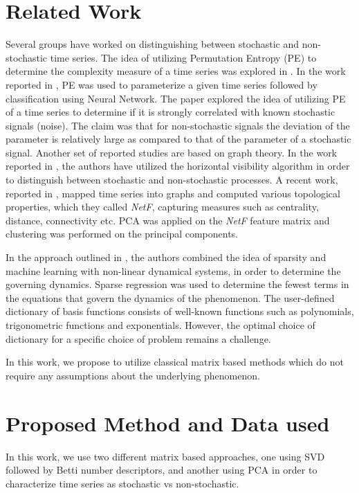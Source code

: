 \documentclass[10pt,conference]{IEEEtran}
\begin{document}
\section{Related Work}
Several groups have worked on distinguishing between stochastic and non-stochastic time series. The idea of utilizing Permutation Entropy (PE) to determine the complexity measure of a time series was explored in \cite{Bandt2002}. In the work reported in \cite{Boaretto2021}, PE was used to parameterize a given time series  followed by classification using  Neural Network. The paper explored the idea of utilizing PE of a time series to determine if it is strongly correlated with known stochastic signals (noise).   The claim was that for non-stochastic signals the deviation of the parameter is relatively large as compared to that of the parameter of a stochastic signal. Another set of reported studies are based on  graph theory. In the work reported in \cite{lacasa2010}, the authors have utilized the horizontal visibility algorithm in order to distinguish between stochastic and non-stochastic processes. A recent work, reported in \cite{Silva2022}, mapped time series into  graphs and computed various topological properties, which they called \textit{NetF}, capturing  measures such as centrality, distance, connectivity etc. PCA was applied on the \textit{NetF} feature matrix and clustering was performed on the principal components.

In the approach outlined in \cite{Brunton2016}, the authors combined the idea of sparsity and machine learning with non-linear dynamical systems, in order to determine the governing dynamics. Sparse regression was used to determine the fewest terms in the equations that govern the dynamics of the phenomenon. The user-defined dictionary of basis functions consists of well-known functions such as polynomials, trigonometric functions and exponentials. However, the optimal choice of dictionary for a specific choice of problem remains a challenge.

In this work, we propose to utilize classical matrix based methods which do not require any assumptions about the underlying phenomenon.

\section{Proposed Method and Data used}

In this work, we use two different matrix based approaches, one using SVD followed by  Betti number descriptors, and  another using PCA in order to characterize time series as stochastic vs non-stochastic.
\end{document}
